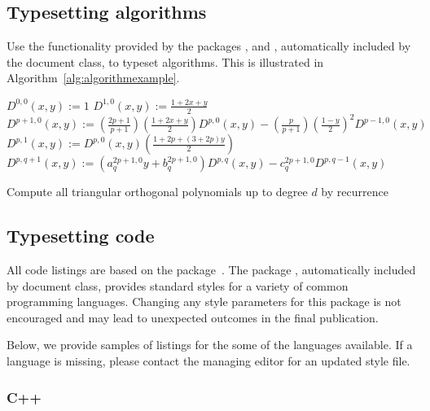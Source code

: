 \documentclass{ansarticle}
\begin{document}
\subsection{Typesetting algorithms}

Use the functionality provided by the packages ,
 and , automatically included by
the  document class, to typeset algorithms. This is
illustrated in Algorithm~\ref{alg:algorithmexample}.

\begin{algorithm}
  \begin{algorithmic}
    \State $D^{0,0}(x,y) := 1$
    \State $D^{1,0}(x,y) := \frac{1+2x+y}{2}$
    \State $D^{p+1,0}(x,y) := \left( \frac{2p+1}{p+1} \right)
    \left( \frac{1 + 2x + y}{2} \right) D^{p,0}(x,y)
    - \left( \frac{p}{p+1} \right) \left( \frac{1-y}{2} \right)^2
    D^{p-1,0}(x,y)$
    \EndFor
    \State $D^{p,1}(x,y) := D^{p,0}(x,y) \left( \frac{1+2p+(3+2p) y}{2} \right)$
    \EndFor
    \State $D^{p,q+1}(x,y) :=
    \left( a_{q}^{2p+1,0} y + b_q^{2p+1,0} \right) D^{p,q}(x,y)
    - c_q^{2p+1,0} D^{p,q-1}(x,y)$
    \EndFor
    \EndFor
  \end{algorithmic}
  \caption{Compute all triangular orthogonal polynomials up to degree
    $d$ by recurrence}
  \label{alg:algorithmexample}
\end{algorithm}

\subsection{Typesetting code}

All code listings are based on the 
package~\citep{HeinzMoses07}. The package ,
automatically included by  document class, provides
standard styles for a variety of common programming
languages. Changing any style parameters for this package is not
encouraged and may lead to unexpected outcomes in the final
publication.

Below, we provide samples of listings for the some of the languages
available. If a language is missing, please contact the managing
editor for an updated style file.

\subsubsection{C++}
\end{document}
